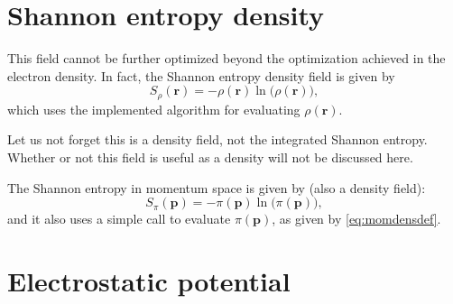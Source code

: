 \section{Shannon entropy density}

This field cannot be further optimized beyond the optimization achieved in the electron density. In fact, the Shannon entropy density field is given by
%
\begin{equation}
   S_{\rho}(\boldsymbol{r})=-\rho(\boldsymbol{r})\ln\big(\rho(\boldsymbol{r})\big),
\end{equation}
%
which uses the implemented algorithm for evaluating $\rho(\boldsymbol{r})$.

Let us not forget this is a density field, not the integrated Shannon entropy. Whether or not this field is useful as a density will not be discussed here.

The Shannon entropy in momentum space is given by (also a density field):
%
\begin{equation}
   S_{\pi}(\boldsymbol{p})=-\pi(\boldsymbol{p})\ln\big(\pi(\boldsymbol{p})\big),
\end{equation}
%
and it also uses a simple call to evaluate $\pi(\boldsymbol{p})$, as given by \ref{eq:momdensdef}.


\section{Electrostatic potential}

